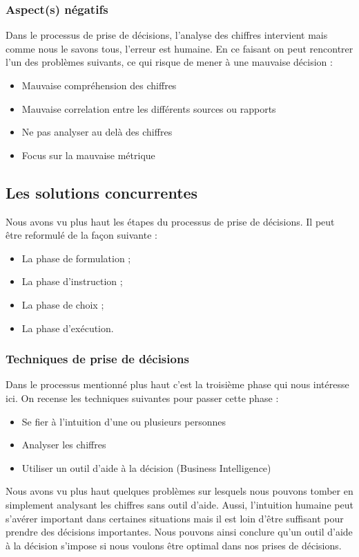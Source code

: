 \subsubsection{Aspect(s) négatifs}
Dans le processus de prise de décisions, l'analyse des chiffres intervient mais comme nous le savons tous, l'erreur est humaine. En ce faisant on peut rencontrer l'un des problèmes suivants, ce qui risque de mener à une mauvaise décision :

\begin{itemize}
    \item Mauvaise compréhension des chiffres
    \item Mauvaise correlation entre les différents sources ou rapports
    \item Ne pas analyser au delà des chiffres
    \item Focus sur la mauvaise métrique
\end{itemize}


\subsection{Les solutions concurrentes}
Nous avons vu plus haut les étapes du processus de prise de décisions. Il peut être reformulé de la façon suivante :
\begin{itemize}
    \item La phase de formulation ;
    \item La phase d’instruction ;
    \item La phase de choix ;
    \item La phase d’exécution.
\end{itemize}
\subsubsection{Techniques de prise de décisions}
Dans le processus mentionné plus haut c’est la troisième phase qui nous intéresse ici. On recense les techniques suivantes pour passer cette phase :
\begin{itemize}
    \item Se fier à l’intuition d’une ou plusieurs personnes
    \item Analyser les chiffres
    \item Utiliser un outil d’aide à la décision (Business Intelligence)
\end{itemize}

Nous avons vu plus haut quelques problèmes sur lesquels nous pouvons tomber en simplement analysant les chiffres sans outil d’aide. Aussi, l’intuition humaine peut s’avérer important dans certaines situations mais il est loin d’être suffisant pour prendre des décisions importantes. Nous pouvons ainsi conclure qu’un outil d’aide à la décision s’impose si nous voulons être optimal dans nos prises de décisions.

